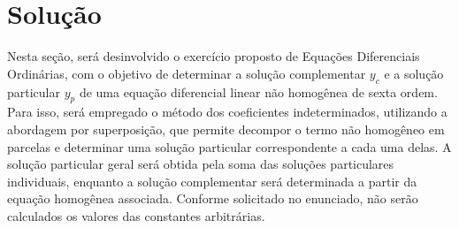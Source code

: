 \section{Solução}

Nesta seção, será desinvolvido o exercício proposto de Equações Diferenciais
Ordinárias, com o objetivo de determinar a solução complementar $y_c$ e a
solução particular $y_p$ de uma equação diferencial linear não homogênea de
sexta ordem. Para isso, será empregado o método dos coeficientes
indeterminados, utilizando a abordagem por superposição, que permite decompor o
termo não homogêneo em parcelas e determinar uma solução particular
correspondente a cada uma delas. A solução particular geral será obtida pela
soma das soluções particulares individuais, enquanto a solução complementar
será determinada a partir da equação homogênea associada. Conforme solicitado
no enunciado, não serão calculados os valores das constantes arbitrárias.



